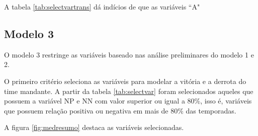 \documentclass[review]{elsarticle}
\begin{document}
\begin{table}[ht]
    \label{tab:selectvartrans}
\end{table}

A tabela \ref{tab:selectvartrans} dá indícios de que as variáveis ``A"


\newpage
\subsection{Modelo 3}
\label{sec:mod3}

O modelo 3 restringe as variáveis baseado nas análise preliminares do modelo 1 e 2.

O primeiro critério seleciona as variáveis para modelar a vitória e a derrota do time mandante. A partir da tabela \ref{tab:selectvar} foram selecionados aqueles que possuem a variável NP e NN com valor superior ou igual a $80\%$, isso é, variáveis que possuem relação positiva ou negativa em mais de $80\%$ das temporadas.

A figura \ref{fig:medresumo} destaca as variáveis selecionadas.
\end{document}
